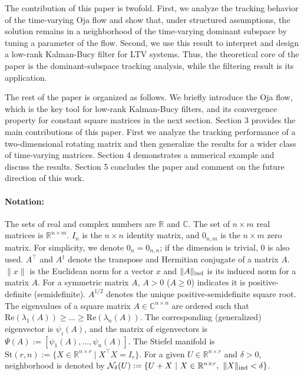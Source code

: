 \documentclass[fleqn,10pt]{SICE_FES26}
\begin{document}
The contribution of this paper is twofold. First, we analyze the tracking behavior of the time-varying Oja flow and show that, under structured assumptions, the solution remains in a neighborhood of the time-varying dominant subspace by tuning a parameter of the flow. Second, we use this result to interpret and design a low-rank Kalman-Bucy filter for LTV systems. Thus, the theoretical core of the paper is the dominant-subspace tracking analysis, while the filtering result is its application.

The rest of the paper is organized as follows. 
We briefly introduce the Oja flow, which is the key tool for low-rank Kalman-Bucy filters, and its convergence property for constant square matrices in the next section. 
Section 3 provides the main contributions of this paper. First we analyze the tracking performance of a two-dimensional rotating matrix and then generalize the results for a wider class of time-varying matrices. 
Section 4 demonstrates a numerical example and discuss the results. 
Section 5 concludes the paper and comment on the future direction of this work.  


\paragraph*{\textbf{Notation:} }
The sets of real and complex numbers are ${\mathbb{R}}$ and $\mathbb{C}$. The set of $n \times m$ real matrices is ${\mathbb{R}}^{n\times m}$. $I_n$ is the $n \times n$ identity matrix, and $0_{n,m}$ is the $n \times m$ zero matrix. For simplicity, we denote $0_{n} = 0_{n,n}$; if the dimension is trivial, $0$ is also used. 
$A^{\top}$ and $A^{\dagger}$ denote the transpose and Hermitian conjugate of a matrix $A$. $\|x\|$ is the Euclidean norm for a vector $x$ and $\| A \| _{\rm ind}$ is its induced norm for a matrix $A$. For a symmetric matrix $A$, $A > 0$ ($A \geq 0$) indicates it is positive-definite (semidefinite). $A^{1/2}$ denotes the unique positive-semidefinite square root. The eigenvalues of a square matrix $A \in {\mathbb{C}}^{n \times n}$ are ordered such that ${\mathrm{Re}}(\lambda_1(A)) \geq \dots \geq {\mathrm{Re}}(\lambda_n(A))$. The corresponding (generalized) eigenvector is $\psi_i(A)$, and the matrix of eigenvectors is $\Psi(A) := [\psi _{1}(A) , \dots , \psi _{n}(A)]$. The Stiefel manifold is ${\mathrm{St}}(r,n) := \{X \in {\mathbb{R}}^{n \times r} \mid X^{\top}X = I_r\}$. 
For a given $U \in {\mathbb{R}}^{n\times r}$ and $\delta >0$, 
neighborhood is denoted by ${\mathcal{N}}_{\delta} (U) := \{ U+X \ | \ X \in {\mathbb{R}}^{n\times r},\ \| X \| _{\rm ind} < \delta \}$. 
\end{document}
